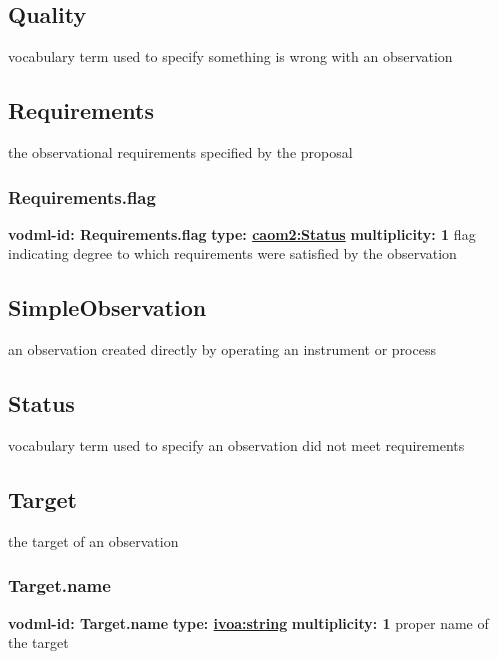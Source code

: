   \subsection{Quality}
  \label{sect:Quality}
    vocabulary term used to specify something is wrong with an observation

  \subsection{Requirements}
  \label{sect:Requirements}
    the observational requirements specified by the proposal

    \subsubsection{Requirements.flag}
      \textbf{vodml-id: Requirements.flag} \newline
      \textbf{type: \hyperref[sect:Status]{caom2:Status}} \newline
      \textbf{multiplicity: 1} \newline
      flag indicating degree to which requirements were satisfied by the observation

  \subsection{SimpleObservation}
  \label{sect:SimpleObservation}
    an observation created directly by operating an instrument or process

  \subsection{Status}
  \label{sect:Status}
    vocabulary term used to specify an observation did not meet requirements

  \subsection{Target}
  \label{sect:Target}
    the target of an observation

    \subsubsection{Target.name}
      \textbf{vodml-id: Target.name} \newline
      \textbf{type: \hyperref[sect:ivoa]{ivoa:string}} \newline
      \textbf{multiplicity: 1} \newline
      proper name of the target

